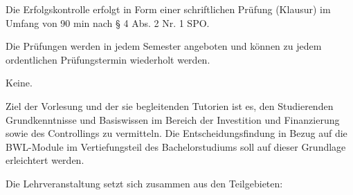 \begin{course}

\setdoclanguagegerman
{}



\coursehead


\label{cour_6109.dp_997}


\begin{styleenv}
\begin{assessment}
Die Erfolgskontrolle erfolgt in Form einer schriftlichen Prüfung (Klausur) im Umfang von 90 min nach § 4 Abs. 2 Nr. 1 SPO.

 

Die Prüfungen werden in jedem Semester angeboten und können zu jedem ordentlichen Prüfungstermin wiederholt werden.


\end{assessment}

\begin{conditions}Keine.\end{conditions}


\end{styleenv}

\begin{learningoutcomes}
Ziel der Vorlesung und der sie begleitenden Tutorien ist es, den Studierenden Grundkenntnisse und Basiswissen im Bereich der Investition und Finanzierung sowie des Controllings zu vermitteln. Die Entscheidungsfindung in Bezug auf die BWL-Module im Vertiefungsteil des Bachelorstudiums soll auf dieser Grundlage erleichtert werden.

 
\end{learningoutcomes}

\begin{content}
Die Lehrveranstaltung setzt sich zusammen aus den Teilgebieten:

 


\end{content}
\end{course}
